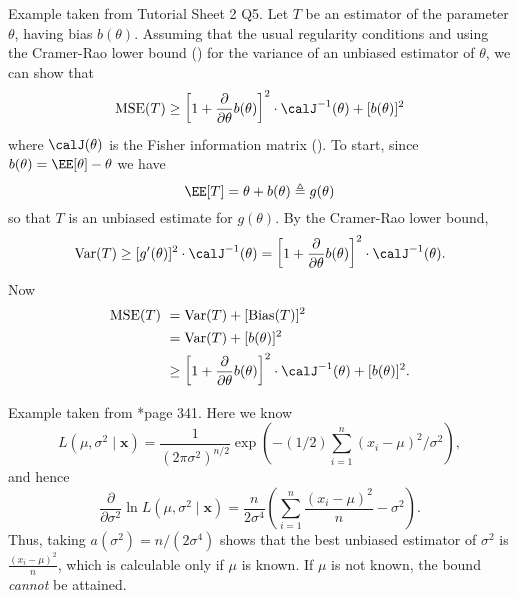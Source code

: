 \begin{exam} \label{exam: MSE_Cramer_ineq}
    Example taken from Tutorial Sheet 2 Q5. Let $T$ be an estimator of the parameter $\theta$, having bias $b(\theta)$. Assuming that the usual regularity conditions and using the Cramer-Rao lower bound () for the variance of an unbiased estimator of $\theta$, we can show that
    \begin{equation*}
        \MSE (T) \geq \left[ 1 + \frac{\partial}{\partial \theta} b(\theta) \right]^2 \cdot \calJ^{-1} (\theta) + [b(\theta)]^2
    \end{equation*}
    where $\calJ (\theta)$ is the Fisher information matrix (). To start, since $b(\theta) = \EE [\theta] - \theta$ we have
    \begin{equation*}
        \EE [T] = \theta + b(\theta) \triangleq g(\theta)
    \end{equation*}
    so that $T$ is an unbiased estimate for $g(\theta)$. By the Cramer-Rao lower bound,
    \begin{equation*}
        \Var (T) \geq [g'(\theta)]^2 \cdot \calJ^{-1} (\theta) = \left[ 1 + \frac{\partial}{\partial \theta} b(\theta) \right]^2 \cdot \calJ^{-1} (\theta).
    \end{equation*}
    Now
    \begin{align*}
        \MSE (T) \
         & = \Var (T) + [\Bias (T)]^2                                                                                      \\
         & = \Var (T) + [b(\theta)]^2                                                                                      \\
         & \geq \left[ 1 + \frac{\partial}{\partial \theta} b(\theta) \right]^2 \cdot \calJ^{-1} (\theta) + [b(\theta)]^2.
    \end{align*}
\end{exam}

\begin{exam} \label{exam: norm_mse_p2}
    Example taken from \cite{CasellaGeorge2001SI}*{page 341}. Here we know
    \begin{equation*}
        L(\mu , \sigma^2 \mid \bm{x}) = \frac{1}{(2 \pi \sigma^2)^{n/2}} \exp \left( -(1/2) \sum_{i=1}^{n} (x_i - \mu)^2 / \sigma^2 \right),
    \end{equation*}
    and hence
    \begin{equation*}
        \frac{\partial}{\partial \sigma^2} \ln L(\mu , \sigma^2 \mid \bm{x}) = \frac{n}{2 \sigma^4} \left( \sum_{i=1}^{n} \frac{(x_i - \mu)^2}{n} - \sigma^2 \right).
    \end{equation*}
    Thus, taking $a(\sigma^2) = n / (2 \sigma^4)$ shows that the best unbiased estimator of $\sigma^2$ is $\frac{(x_i - \mu)^2}{n}$, which is calculable only if $\mu$ is known. If $\mu$ is not known, the bound {\it cannot} be attained.
\end{exam}

